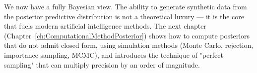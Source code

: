 We now have a fully Bayesian view. The ability to generate synthetic data from the posterior predictive distribution is not a theoretical luxury — it is the core that fuels modern artificial intelligence methods. The next chapter (Chapter~\ref{ch:ComputationalMethodPosterior}) shows how to compute posteriors that do not admit closed form, using simulation methods (Monte Carlo, rejection, importance sampling, MCMC), and introduces the technique of "perfect sampling" that can multiply precision by an order of magnitude.
